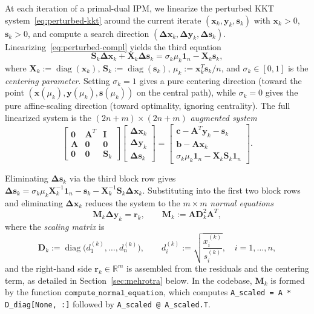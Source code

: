 \documentclass[11pt,twoside]{article}
\newcommand{\R}{\mathbb{R}}
\newcommand{\bA}{\mathbf{A}}
\newcommand{\bb}{\mathbf{b}}
\newcommand{\bc}{\mathbf{c}}
\newcommand{\bx}{\mathbf{x}}
\newcommand{\by}{\mathbf{y}}
\newcommand{\bs}{\mathbf{s}}
\newcommand{\bD}{\mathbf{D}}
\newcommand{\bM}{\mathbf{M}}
\newcommand{\bS}{\mathbf{S}}
\newcommand{\bX}{\mathbf{X}}
\newcommand{\br}{\mathbf{r}}
\newcommand{\bDelta}{\mathbf{\Delta}}
\newcommand{\diag}{\operatorname{diag}}
\begin{document}
At each iteration of a primal-dual IPM, we linearize the perturbed KKT
system~\eqref{eq:perturbed-kkt} around the current iterate
$(\bx_k, \by_k, \bs_k)$ with $\bx_k > 0$, $\bs_k > 0$, and compute a
search direction $(\bDelta\bx_k, \bDelta\by_k, \bDelta\bs_k)$.
Linearizing~\eqref{eq:perturbed-compl} yields the third equation
\begin{equation}
  \bS_k \bDelta\bx_k + \bX_k \bDelta\bs_k = \sigma_k \mu_k \mathbf{1}_n
  - \bX_k \bs_k,
  \label{eq:linearized-compl}
\end{equation}
where $\bX_k := \diag(\bx_k)$, $\bS_k := \diag(\bs_k)$, $\mu_k :=
\bx_k^T\bs_k / n$, and $\sigma_k \in [0,1]$ is the \emph{centering
parameter}.  Setting $\sigma_k = 1$ gives a pure centering direction
(toward the point $(\bx(\mu_k), \by(\mu_k), \bs(\mu_k))$ on the central
path), while $\sigma_k = 0$ gives the pure affine-scaling direction
(toward optimality, ignoring centrality).  The full linearized system is
the $(2n+m) \times (2n+m)$ \emph{augmented system}
\begin{equation}
  \begin{bmatrix}
    \mathbf{0} & \bA^T & \mathbf{I} \\
    \bA        & \mathbf{0} & \mathbf{0} \\
    \mathbf{0} & \mathbf{0} & \bS_k
  \end{bmatrix}
  \begin{bmatrix}
    \bDelta\bx_k \\ \bDelta\by_k \\ \bDelta\bs_k
  \end{bmatrix}
  =
  \begin{bmatrix}
    \bc - \bA^T\by_k - \bs_k \\
    \bb - \bA\bx_k \\
    \sigma_k \mu_k \mathbf{1}_n - \bX_k\bS_k \mathbf{1}_n
  \end{bmatrix}.
  \label{eq:augmented-system}
\end{equation}

Eliminating $\bDelta\bs_k$ via the third block row gives
$\bDelta\bs_k = \sigma_k \mu_k \bX_k^{-1}\mathbf{1}_n - \bs_k -
\bX_k^{-1}\bS_k\bDelta\bx_k$.  Substituting into the first two block rows
and eliminating $\bDelta\bx_k$ reduces the system to the $m \times m$
\emph{normal equations}
\begin{equation}
  \boxed{\bM_k \bDelta\by_k = \br_k}, \qquad
  \bM_k := \bA \bD_k^2 \bA^T,
  \label{eq:normal-detailed}
\end{equation}
where the \emph{scaling matrix} is
\begin{equation}
  \bD_k := \diag\bigl(d_1^{(k)},\dots,d_n^{(k)}\bigr),\qquad
  d_i^{(k)} := \sqrt{\frac{x_i^{(k)}}{s_i^{(k)}}},\quad i=1,\dots,n,
  \label{eq:scaling}
\end{equation}
and the right-hand side $\br_k \in \R^m$ is assembled from the residuals
and the centering term, as detailed in Section~\ref{sec:mehrotra} below.
In the codebase, $\bM_k$ is formed by the function
$\texttt{compute\_normal\_equation}$, which computes
\texttt{A\_scaled = A * D\_diag[None, :]} followed by
\texttt{A\_scaled @ A\_scaled.T}.
\end{document}
